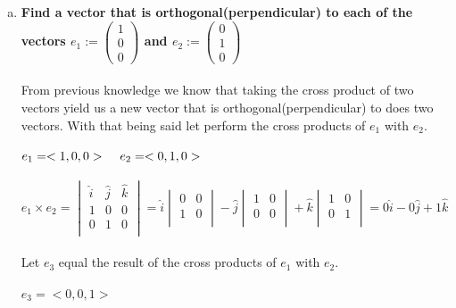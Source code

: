 \documentclass{article}
\begin{document}
\begin{enumerate}[b.]
	\item\textbf{Find a vector that is orthogonal(perpendicular) to each of the vectors $e_{1}:= \left(\!
	      \begin{array}{c}
	      	1 \\
	      	0 \\
	      	0 
	      \end{array}
	      \!\right)$ and $e_{2}:=\left(\!
	      \begin{array}{c}
	      	0 \\
	      	1 \\
	      	0 
	      \end{array}
	      \!\right)$}
	\\
	\\
	From previous knowledge we know that taking the cross product of two vectors yield us a new vector that is orthogonal(perpendicular) to does two vectors. With that being said let perform the cross products of $e_{1}$ with $e_{2}$.
	\\\\
	$e_{1}=<1,0,0>\hspace{.4cm}e_{2}=<0,1,0>$\\
	\\
	$e_{1} \times e_{2}=\begin{vmatrix}
	\hat{i}&\hat{j}&\hat{k}\\
	1&0&0\\
	0&1&0\\
	\end{vmatrix}=\hat{i}\begin{vmatrix}
	0&0\\
	1&0\\
	\end{vmatrix}-\hat{j}\begin{vmatrix}
	1&0\\
	0&0\\
	\end{vmatrix}+\hat{k}\begin{vmatrix}
	1&0\\
	0&1\\
	\end{vmatrix}=0\hat{i}-0\hat{j}+1\hat{k}$\\
	\\
	Let $e_{3}$ equal the result of the cross  products of $e_{1}$ with $e_{2}$.\\
	\\
	$e_{3}=<0,0,1>$
\end{enumerate}
\end{document}
